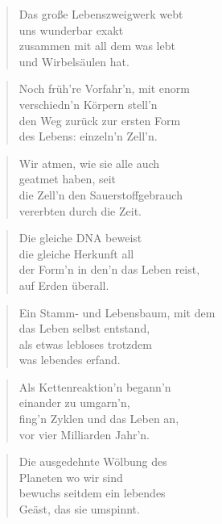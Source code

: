 \documentclass[10pt,a4paper]{article}
\begin{document}
\begin{paracol}{2}
\begin{verse}
Das große Lebenszweigwerk webt \\
uns wunderbar exakt \\
zusammen mit all dem was lebt \\
und Wirbelsäulen hat. \\
\end{verse}

\begin{verse}
Noch früh’re Vorfahr’n, mit enorm \\
verschiedn’n Körpern stell’n \\
den Weg zurück zur ersten Form \\
des Lebens: einzeln’n Zell’n. \\
\end{verse}

\begin{verse}
Wir atmen, wie sie alle auch \\
geatmet haben, seit \\
die Zell’n den Sauerstoffgebrauch \\
vererbten durch die Zeit. \\
\end{verse}

\begin{verse}
Die gleiche DNA beweist \\
die gleiche Herkunft all \\
der Form’n in den’n das Leben reist, \\
auf Erden überall. \\
\end{verse}

\begin{verse}
Ein Stamm- und Lebensbaum, mit dem \\
das Leben selbst entstand, \\
als etwas lebloses trotzdem \\
was lebendes erfand. \\
\end{verse}

\begin{verse}
Als Kettenreaktion’n begann’n \\
einander zu umgarn’n, \\
fing’n Zyklen und das Leben an, \\
vor vier Milliarden Jahr’n. \\
\end{verse}

\begin{verse}
Die ausgedehnte Wölbung des \\
Planeten wo wir sind \\
bewuchs seitdem ein lebendes \\
Geäst, das sie umspinnt. \\
\end{verse}


\end{paracol}
\end{document}
